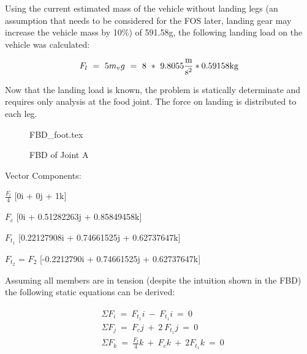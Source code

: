 \documentclass[12pt,letterpaper]{article}
\begin{document}
Using the current estimated mass of the vehicle without landing legs (an assumption that needs to be considered for the FOS later, landing gear may increase the vehicle mass by 10\%) of 591.58\unit{\g}, the following landing load on the vehicle was calculated:

\begin{gather}
    F_l~=~5m_vg~=~8~*~9.8055\unit[per-mode = fraction]{\m\per\s\squared} * 0.59158\unit{\kg}
\end{gather}

Now that the landing load is known, the problem is statically determinate and requires only analysis at the food joint. The force on landing is distributed to each leg.

\begin{figure}[h!]
\centering
{FBD_foot.tex}
\caption{FBD of Joint A}
\end{figure}

\begin{description}
    \item Vector Components:
    \item $\frac{F_l}{4}$ [0i + 0j + 1k]
    \item $F_c$ [0i + 0.51282263j  + 0.85849458k]
    \item $F_{t_1}$ [0.22127908i + 0.74661525j + 0.62737647k]
    \item $F_{t_2}$ = $F_2$ [-0.2212790i + 0.74661525j + 0.62737647k]
\end{description}

Assuming all members are in tension (despite the intuition shown in the FBD) the following static equations can be derived:

\begin{gather}
\begin{aligned}
    & \Sigma F_i~=~F_{t_1}i~-~F_{t_1}i~=~0
    \\
    & \Sigma F_j~=~F_cj~+~2~F_{t_1}j~=~0 
    \\
    & \Sigma F_k~=~\frac{F_l}{4}k~+~F_ck~+~2F_{t_1}k~=~0 
\end{aligned}
\end{gather}

\pagebreak
\end{document}
